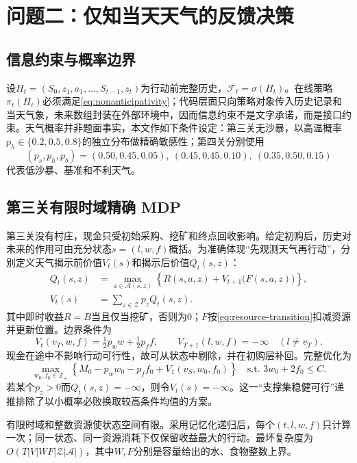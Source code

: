 \section{问题二：仅知当天天气的反馈决策}

\subsection{信息约束与概率边界}

设$H_t=(S_0,z_1,a_1,\ldots,S_{t-1},z_t)$为行动前完整历史，$\mathcal F_t=\sigma(H_t)$。在线策略$\pi_t(H_t)$必须满足\cref{eq:nonanticipativity}；代码层面只向策略对象传入历史记录和当天气象，未来数组封装在外部环境中，因而信息约束不是文字承诺，而是接口约束。天气概率并非题面事实，本文作如下条件设定：第三关无沙暴，以高温概率$p_h\in\{0.2,0.5,0.8\}$的独立分布做精确敏感性；第四关分别使用
\[
(p_s,p_h,p_b)=(0.50,0.45,0.05),\ (0.45,0.45,0.10),\ (0.35,0.50,0.15)
\]
代表低沙暴、基准和不利天气。

\subsection{第三关有限时域精确 MDP}

第三关没有村庄，现金只受初始采购、挖矿和终点回收影响。给定初购后，历史对未来的作用可由充分状态$s=(l,w,f)$概括。为准确体现“先观测天气再行动”，分别定义天气揭示前价值$V_t(s)$和揭示后价值$Q_t(s,z)$：
\begin{align}
Q_t(s,z)&=\max_{a\in\mathcal A(s,z)}
\left\{R(s,a,z)+V_{t+1}\bigl(F(s,a,z)\bigr)\right\},
\label{eq:post-weather-bellman}\\
V_t(s)&=\sum_{z\in\mathcal Z}p_zQ_t(s,z).
\label{eq:pre-weather-bellman}
\end{align}
其中即时收益$R=B$当且仅当挖矿，否则为0；$F$按\cref{eq:resource-transition}扣减资源并更新位置。边界条件为
\begin{equation}
V_t(v_T,w,f)=\tfrac12p_ww+\tfrac12p_ff,\qquad
V_{T+1}(l,w,f)=-\infty\quad(l\ne v_T).
\label{eq:mdp-boundary}
\end{equation}
现金在途中不影响行动可行性，故可从状态中剔除，并在初购层补回。完整优化为
\begin{equation}
\max_{w_0,f_0\in\mathbb Z_+}
\left\{M_0-p_ww_0-p_ff_0+V_1(v_S,w_0,f_0)\right\}
\quad\text{s.t. }3w_0+2f_0\le C.
\label{eq:mdp-initial-load}
\end{equation}
若某个$p_z>0$而$Q_t(s,z)=-\infty$，则令$V_t(s)=-\infty$。这一“支撑集稳健可行”递推排除了以小概率必败换取较高条件均值的方案。

有限时域和整数资源使状态空间有限。采用记忆化递归后，每个$(t,l,w,f)$只计算一次；同一状态、同一资源消耗下仅保留收益最大的行动。最坏复杂度为$O(T|V|WF|\mathcal Z|\mathcal A|)$，其中$W,F$分别是容量给出的水、食物整数上界。

